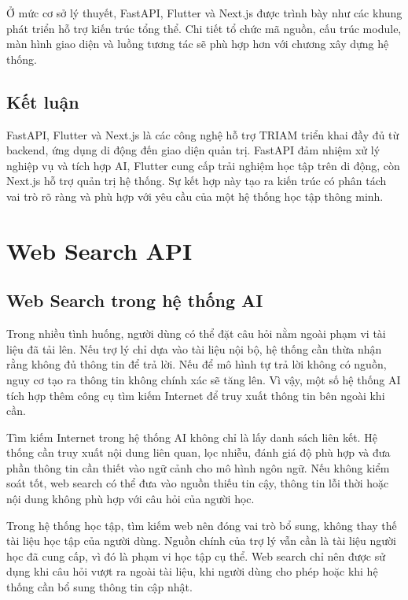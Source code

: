 \documentclass[12pt,a4paper]{report}
\begin{document}
Ở mức cơ sở lý thuyết, FastAPI, Flutter và Next.js được trình bày như các khung phát triển hỗ trợ kiến trúc tổng thể. Chi tiết tổ chức mã nguồn, cấu trúc module, màn hình giao diện và luồng tương tác sẽ phù hợp hơn với chương xây dựng hệ thống.

\subsection{Kết luận}

FastAPI, Flutter và Next.js là các công nghệ hỗ trợ TRIAM triển khai đầy đủ từ backend, ứng dụng di động đến giao diện quản trị. FastAPI đảm nhiệm xử lý nghiệp vụ và tích hợp AI, Flutter cung cấp trải nghiệm học tập trên di động, còn Next.js hỗ trợ quản trị hệ thống. Sự kết hợp này tạo ra kiến trúc có phân tách vai trò rõ ràng và phù hợp với yêu cầu của một hệ thống học tập thông minh.

\section{Web Search API}

\subsection{Web Search trong hệ thống AI}

Trong nhiều tình huống, người dùng có thể đặt câu hỏi nằm ngoài phạm vi tài liệu đã tải lên. Nếu trợ lý chỉ dựa vào tài liệu nội bộ, hệ thống cần thừa nhận rằng không đủ thông tin để trả lời. Nếu để mô hình tự trả lời không có nguồn, nguy cơ tạo ra thông tin không chính xác sẽ tăng lên. Vì vậy, một số hệ thống AI tích hợp thêm công cụ tìm kiếm Internet để truy xuất thông tin bên ngoài khi cần.

Tìm kiếm Internet trong hệ thống AI không chỉ là lấy danh sách liên kết. Hệ thống cần truy xuất nội dung liên quan, lọc nhiễu, đánh giá độ phù hợp và đưa phần thông tin cần thiết vào ngữ cảnh cho mô hình ngôn ngữ. Nếu không kiểm soát tốt, web search có thể đưa vào nguồn thiếu tin cậy, thông tin lỗi thời hoặc nội dung không phù hợp với câu hỏi của người học.

Trong hệ thống học tập, tìm kiếm web nên đóng vai trò bổ sung, không thay thế tài liệu học tập của người dùng. Nguồn chính của trợ lý vẫn cần là tài liệu người học đã cung cấp, vì đó là phạm vi học tập cụ thể. Web search chỉ nên được sử dụng khi câu hỏi vượt ra ngoài tài liệu, khi người dùng cho phép hoặc khi hệ thống cần bổ sung thông tin cập nhật.
\end{document}
